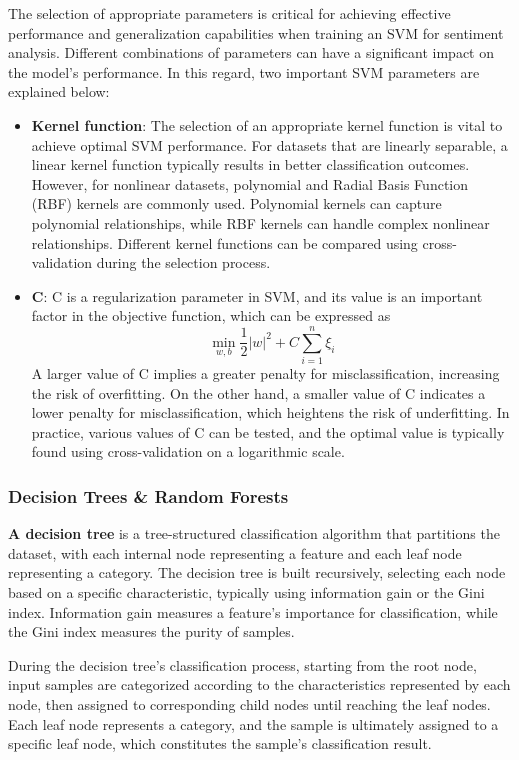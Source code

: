 \documentclass[a4paper]{article}
\begin{document}
The selection of appropriate parameters is critical for achieving effective performance and generalization capabilities when training an SVM for sentiment analysis. Different combinations of parameters can have a significant impact on the model's performance. In this regard, two important SVM parameters are explained below:
\begin{itemize}
    \item \textbf{Kernel function}: The selection of an appropriate kernel function is vital to achieve optimal SVM performance. For datasets that are linearly separable, a linear kernel function typically results in better classification outcomes. However, for nonlinear datasets, polynomial and Radial Basis Function (RBF) kernels are commonly used. Polynomial kernels can capture polynomial relationships, while RBF kernels can handle complex nonlinear relationships. Different kernel functions can be compared using cross-validation during the selection process.\cite{ref_svm1}
    \item \textbf{C}: C is a regularization parameter in SVM, and its value is an important factor in the objective function, which can be expressed as $$\min_{w, b} \frac{1}{2} |w|^2 + C \sum_{i=1}^n \xi_i$$A larger value of C implies a greater penalty for misclassification, increasing the risk of overfitting. On the other hand, a smaller value of C indicates a lower penalty for misclassification, which heightens the risk of underfitting. In practice, various values of C can be tested, and the optimal value is typically found using cross-validation on a logarithmic scale. \cite{ref_svm3}
\end{itemize}

\subsubsection{Decision Trees \& Random Forests}

\textbf{A decision tree} is a tree-structured classification algorithm that partitions the dataset, with each internal node representing a feature and each leaf node representing a category. The decision tree is built recursively, selecting each node based on a specific characteristic, typically using information gain or the Gini index. Information gain measures a feature's importance for classification, while the Gini index measures the purity of samples.

During the decision tree's classification process, starting from the root node, input samples are categorized according to the characteristics represented by each node, then assigned to corresponding child nodes until reaching the leaf nodes. Each leaf node represents a category, and the sample is ultimately assigned to a specific leaf node, which constitutes the sample's classification result.\cite{ref_dt2}
\end{document}
